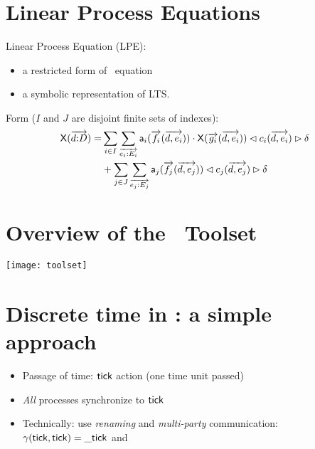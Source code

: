 \begin{slide}
\newslide\section*{Linear Process Equations}
Linear Process Equation (LPE): 
\begin{itemize}
\item a restricted form of \mcrl\ equation
\item a symbolic representation of LTS.
\end{itemize}
\pause
Form ($I$ and $J$ are disjoint finite sets of indexes):
\begin{gather*}
\begin{split}
\mathsf{X}(\overrightarrow{d{:} D})=&\sum_{i\in I}\sum_{\overrightarrow{e_i{:} E_i}} \mathsf{a}_i(\overrightarrow{f_i}(\overrightarrow{d,e_i}))\mathbin{\cdot}
\mathsf{X}(\overrightarrow{g_i}(\overrightarrow{d,e_i}))\lhd c_i(\overrightarrow{d,e_i})\rhd\delta\\
&+\sum_{j\in J}\sum_{\overrightarrow{e_j{:} E_j}} \mathsf{a}_j(\overrightarrow{f_j}(\overrightarrow{d,e_j}))\lhd c_j(\overrightarrow{d,e_j})\rhd\delta
\end{split}
\end{gather*}   
\newslide\section*{Overview of the \mcrl\ Toolset}
\begin{center}
\texttt{[image: toolset]}
\end{center}
\newslide\section*{Discrete time in \mcrl: a simple approach}
\begin{itemize}
\item Passage of time: $\mathsf{tick}$ action (one time unit passed)
\item \emph{All} processes synchronize to $\mathsf{tick}$ 
\pause
\item Technically: use \emph{renaming} and \emph{multi-party} communication:
$\gamma(\mathsf{tick},\mathsf{tick})=\mathsf{\_tick}$ and 
\end{itemize}
\vspace{-2ex}
\begin{gather*}

\end{gather*}
\end{slide}
